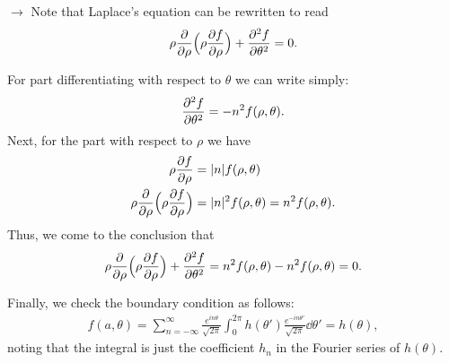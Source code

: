 \def\duedate{10/14/22}
\def\HWnum{4}



    

$\rightarrow$ Note that Laplace's equation can be rewritten to read
\begin{eqnarray}
    \label{eq:rewrite-Laplace}
    \rho\pdv{\rho} \Big( \rho \pdv{f}{\rho} \Big) + \pdv[2]{f}{\theta} = 0
.\end{eqnarray}


For part differentiating with respect to $\theta$ we can write simply:
\begin{eqnarray}
    \label{eq:2-pdv-theta}
    \pdv[2]{f}{\theta} = -n^2f(\rho,\theta)
.\end{eqnarray}
Next, for the part with respect to $\rho$ we have
\begin{align}
    \label{eq:pdv-rho}
    \rho\pdv{f}{\rho} &= |n|f(\rho,\theta) \\
    \rho\pdv{\rho} \Big( \rho\pdv{f}{\rho} \Big) &= |n|^2 f(\rho,\theta) = n^2 f(\rho,\theta)
.\end{align}
Thus, we come to the conclusion that
\begin{eqnarray}
    \label{eq:Laplace-solution}
    \rho \pdv{\rho} \Big( \rho\pdv{f}{\rho} \Big) + \pdv[2]{f}{\theta} = n^2f(\rho,\theta) - n^2f(\rho,\theta) = 0
.\end{eqnarray}

Finally, we check the boundary condition as follows:
\begin{eqnarray}
    \label{eq:f-at-a}
    f(a,\theta) = \sum_{n=-\infty}^{\infty} \frac{e^{in\theta}}{\sqrt{2\pi}}\int_{0}^{2\pi} h(\theta') \frac{e^{-in\theta'}}{\sqrt{2\pi}} \dd{\theta'} = h(\theta)
,\end{eqnarray} 
noting that the integral is just the coefficient $h_{n}$ in the Fourier series of $h(\theta)$.



